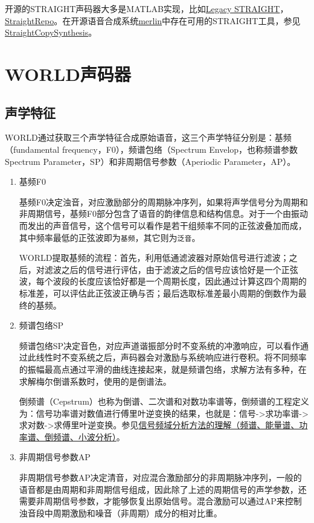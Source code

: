 \documentclass[cn,10pt,math=newtx,citestyle=gb7714-2015,bibstyle=gb7714-2015]{elegantbook}
\begin{document}
开源的STRAIGHT声码器大多是MATLAB实现，比如\href{https://github.com/HidekiKawahara/legacy_STRAIGHT}{Legacy STRAIGHT}，\href{https://github.com/ashmanmode/StraightRepo}{StraightRepo}。在开源语音合成系统\href{https://github.com/CSTR-Edinburgh/merlin}{merlin}中存在可用的STRAIGHT工具，参见\href{https://github.com/CSTR-Edinburgh/merlin/blob/master/misc/scripts/vocoder/straight/copy_synthesis.sh}{StraightCopySynthesis}。

\section{WORLD声码器}

\subsection{声学特征}

WORLD通过获取三个声学特征合成原始语音，这三个声学特征分别是：基频（fundamental frequency，F0），频谱包络（Spectrum Envelop，也称频谱参数Spectrum Parameter，SP）和非周期信号参数（Aperiodic Parameter，AP）。

\begin{enumerate}
  \item 基频F0
  
  基频F0决定浊音，对应激励部分的周期脉冲序列，如果将声学信号分为周期和非周期信号，基频F0部分包含了语音的韵律信息和结构信息。对于一个由振动而发出的声音信号，这个信号可以看作是若干组频率不同的正弦波叠加而成，其中频率最低的正弦波即为\lstinline{基频}，其它则为\lstinline{泛音}。

  WORLD提取基频的流程：首先，利用低通滤波器对原始信号进行滤波；之后，对滤波之后的信号进行评估，由于滤波之后的信号应该恰好是一个正弦波，每个波段的长度应该恰好都是一个周期长度，因此通过计算这四个周期的标准差，可以评估此正弦波正确与否；最后选取标准差最小周期的倒数作为最终的基频。

  \item 频谱包络SP
  
  频谱包络SP决定音色，对应声道谐振部分时不变系统的冲激响应，可以看作通过此线性时不变系统之后，声码器会对激励与系统响应进行卷积。将不同频率的振幅最高点通过平滑的曲线连接起来，就是频谱包络，求解方法有多种，在求解梅尔倒谱系数时，使用的是倒谱法。

  \begin{note}
    倒频谱（Cepstrum）也称为倒谱、二次谱和对数功率谱等，倒频谱的工程定义为：信号功率谱对数值进行傅里叶逆变换的结果，也就是：信号->求功率谱->求对数->求傅里叶逆变换。参见\href{https://zhuanlan.zhihu.com/p/34989414}{信号频域分析方法的理解（频谱、能量谱、功率谱、倒频谱、小波分析）}。
  \end{note}

  \item 非周期信号参数AP
  
  非周期信号参数AP决定清音，对应混合激励部分的非周期脉冲序列，一般的语音都是由周期和非周期信号组成，因此除了上述的周期信号的声学参数，还需要非周期信号参数，才能够恢复出原始信号。混合激励可以通过AP来控制浊音段中周期激励和噪音（非周期）成分的相对比重。

\end{enumerate}
\end{document}
